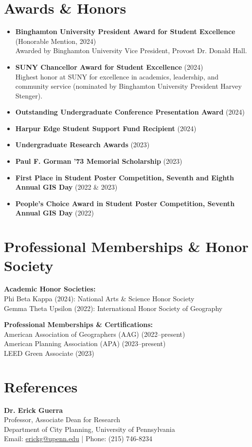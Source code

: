 \documentclass[11pt]{article}
\begin{document}
\section*{Awards \& Honors}
\begin{itemize}[leftmargin=*]
    \item \textbf{Binghamton University President Award for Student Excellence} (Honorable Mention, 2024) \\
    Awarded by Binghamton University Vice President, Provost Dr. Donald Hall.
    \item \textbf{SUNY Chancellor Award for Student Excellence} (2024) \\
    Highest honor at SUNY for excellence in academics, leadership, and community service (nominated by Binghamton University President Harvey Stenger).
    \item \textbf{Outstanding Undergraduate Conference Presentation Award} (2024)
    \item \textbf{Harpur Edge Student Support Fund Recipient} (2024)
    \item \textbf{Undergraduate Research Awards} (2023)
    \item \textbf{Paul F. Gorman '73 Memorial Scholarship} (2023)
    \item \textbf{First Place in Student Poster Competition, Seventh and Eighth Annual GIS Day} (2022 \& 2023)
    \item \textbf{People's Choice Award in Student Poster Competition, Seventh Annual GIS Day} (2022)
\end{itemize}

\section*{Professional Memberships \& Honor Society}
\noindent
\textbf{Academic Honor Societies:} \\
Phi Beta Kappa (2024): National Arts \& Science Honor Society \\
Gemma Theta Upsilon (2022): International Honor Society of Geography

\vspace{2mm}
\noindent
\textbf{Professional Memberships \& Certifications:} \\
American Association of Geographers (AAG) (2022--present) \\
American Planning Association (APA) (2023--present) \\
LEED Green Associate (2023)

\section*{References}
\noindent
\textbf{Dr. Erick Guerra} \\
Professor, Associate Dean for Research \\
Department of City Planning, University of Pennsylvania \\
Email: \href{mailto:erickg@upenn.edu}{erickg@upenn.edu} \quad | \quad Phone: (215) 746-8234
\end{document}

